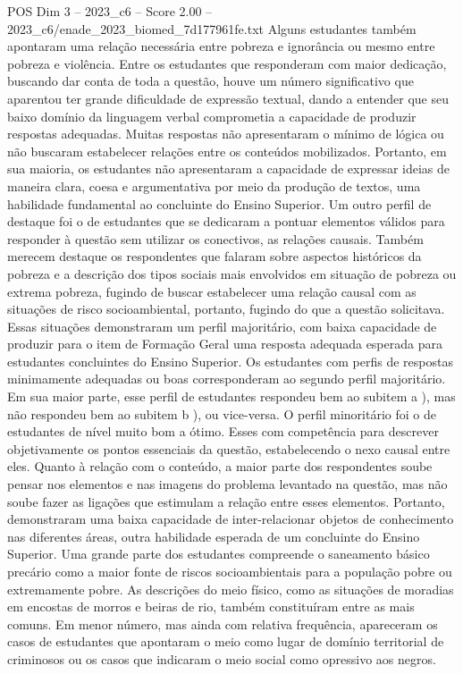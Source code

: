 \begin{textsample}{POS Dim 3 – 2023\_c6 – Score 2.00 – 2023\_c6/enade\_2023\_biomed\_7d177961fe.txt}
Alguns estudantes também apontaram uma relação necessária entre pobreza e ignorância ou mesmo entre pobreza e violência.
Entre os estudantes que responderam com maior dedicação, buscando dar conta de toda a questão, houve um número significativo que aparentou ter grande dificuldade de expressão textual, dando a entender que seu baixo domínio da linguagem verbal comprometia a capacidade de produzir respostas adequadas.
Muitas respostas não apresentaram o mínimo de lógica ou não buscaram estabelecer relações entre os conteúdos mobilizados.
Portanto, em sua maioria, os estudantes não apresentaram a capacidade de expressar ideias de maneira clara, coesa e argumentativa por meio da produção de textos, uma habilidade fundamental ao concluinte do Ensino Superior.
Um outro perfil de destaque foi o de estudantes que se dedicaram a pontuar elementos válidos para responder à questão sem utilizar os conectivos, as relações causais.
Também merecem destaque os respondentes que falaram sobre aspectos históricos da pobreza e a descrição dos tipos sociais mais envolvidos em situação de pobreza ou extrema pobreza, fugindo de buscar estabelecer uma relação causal com as situações de risco socioambiental, portanto, fugindo do que a questão solicitava.
Essas situações demonstraram um perfil majoritário, com baixa capacidade de produzir para o item de Formação Geral uma resposta adequada esperada para estudantes concluintes do Ensino Superior.
Os estudantes com perfis de respostas minimamente adequadas ou boas corresponderam ao segundo perfil majoritário.
Em sua maior parte, esse perfil de estudantes respondeu bem ao subitem a ), mas não respondeu bem ao subitem b ), ou vice-versa.
O perfil minoritário foi o de estudantes de nível muito bom a ótimo.
Esses com competência para descrever objetivamente os pontos essenciais da questão, estabelecendo o nexo causal entre eles.
Quanto à relação com o conteúdo, a maior parte dos respondentes soube pensar nos elementos e nas imagens do problema levantado na questão, mas não soube fazer as ligações que estimulam a relação entre esses elementos.
Portanto, demonstraram uma baixa capacidade de inter-relacionar objetos de conhecimento nas diferentes áreas, outra habilidade esperada de um concluinte do Ensino Superior.
Uma grande parte dos estudantes compreende o saneamento básico precário como a maior fonte de riscos socioambientais para a população pobre ou extremamente pobre.
As descrições do meio físico, como as situações de moradias em encostas de morros e beiras de rio, também constituíram entre as mais comuns.
Em menor número, mas ainda com relativa frequência, apareceram os casos de estudantes que apontaram o meio como lugar de domínio territorial de criminosos ou os casos que indicaram o meio social como opressivo aos negros.

\end{textsample}
